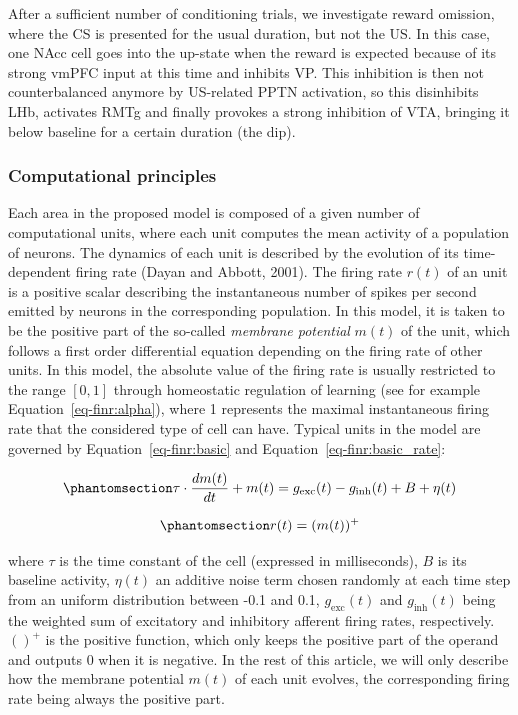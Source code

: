 \documentclass[
  11pt,
  a4paper,
]{scrbook}
\begin{document}
After a sufficient number of conditioning trials, we investigate reward
omission, where the CS is presented for the usual duration, but not the
US. In this case, one NAcc cell goes into the up-state when the reward
is expected because of its strong vmPFC input at this time and inhibits
VP. This inhibition is then not counterbalanced anymore by US-related
PPTN activation, so this disinhibits LHb, activates RMTg and finally
provokes a strong inhibition of VTA, bringing it below baseline for a
certain duration (the dip).

\subsubsection*{Computational
principles}\label{computational-principles}

Each area in the proposed model is composed of a given number of
computational units, where each unit computes the mean activity of a
population of neurons. The dynamics of each unit is described by the
evolution of its time-dependent firing rate (Dayan and Abbott, 2001).
The firing rate \(r(t)\) of an unit is a positive scalar describing the
instantaneous number of spikes per second emitted by neurons in the
corresponding population. In this model, it is taken to be the positive
part of the so-called \emph{membrane potential} \(m(t)\) of the unit,
which follows a first order differential equation depending on the
firing rate of other units. In this model, the absolute value of the
firing rate is usually restricted to the range \([0, 1]\) through
homeostatic regulation of learning (see for example
Equation~\ref{eq-finr:alpha}), where 1 represents the maximal
instantaneous firing rate that the considered type of cell can have.
Typical units in the model are governed by Equation~\ref{eq-finr:basic}
and Equation~\ref{eq-finr:basic_rate}:

\begin{equation}\phantomsection\label{eq-finr:basic}{
    \tau \cdot \frac{dm(t)}{dt} + m(t) =  g_{\text{exc}}(t) - g_{\text{inh}}(t) + B +\eta(t)
}\end{equation}

\begin{equation}\phantomsection\label{eq-finr:basic_rate}{
    r(t) = (m(t))^+
}\end{equation}

where \(\tau\) is the time constant of the cell (expressed in
milliseconds), \(B\) is its baseline activity, \(\eta(t)\) an additive
noise term chosen randomly at each time step from an uniform
distribution between -0.1 and 0.1, \(g_{\text{exc}}(t)\) and
\(g_{\text{inh}}(t)\) being the weighted sum of excitatory and
inhibitory afferent firing rates, respectively. \(()^+\) is the positive
function, which only keeps the positive part of the operand and outputs
0 when it is negative. In the rest of this article, we will only
describe how the membrane potential \(m(t)\) of each unit evolves, the
corresponding firing rate being always the positive part.
\end{document}
